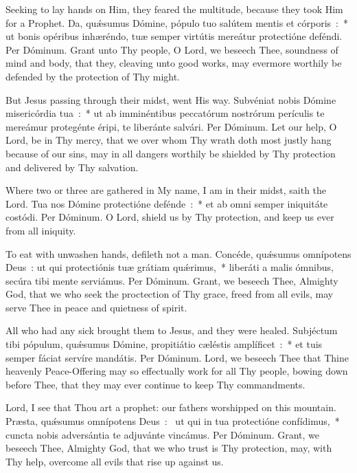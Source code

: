 {{  
  {Seeking to lay hands on Him, they feared the multitude, because they took Him for a Prophet.}
  {Da, quǽsumus Dómine, pópulo tuo salútem mentis et córporis~:~* ut bonis opéribus inhæréndo, tuæ semper virtútis mereátur protectióne deféndi. Per Dóminum.}
  {Grant unto Thy people, O Lord, we beseech Thee, soundness of mind and body, that they, cleaving unto good works, may evermore worthily be defended by the protection of Thy might.}

  {But Jesus passing through their midst, went His way.}
  {Subvéniat nobis Dómine misericórdia tua~:~* ut ab imminéntibus peccatórum nostrórum perículis te mereámur protegénte éripi, te liberánte salvári. Per Dóminum.}
  {Let our help, O Lord, be in Thy mercy, that we over whom Thy wrath doth most justly hang because of our sins, may in all dangers worthily be shielded by Thy protection and delivered by Thy salvation.}

  {Where two or three are gathered in My name, I am in their midst, saith the Lord.}
  {Tua nos Dómine protectióne defénde~:~* et ab omni semper iniquitáte costódi. Per Dóminum.}
  {O Lord, shield us by Thy protection, and keep us ever from all iniquity.}

  {To eat with unwashen hands, defileth not a man.}
  {Concéde, quǽsumus omnípotens Deus~: ut qui protectiónis tuæ grátiam quǽrimus,~* liberáti a malis ómnibus, secúra tibi mente serviámus. Per Dóminum.}
  {Grant, we beseech Thee, Almighty God, that we who seek the proctection of Thy grace, freed from all evils, may serve Thee in peace and quietness of spirit.}

  {All who had any sick brought them to Jesus, and they were healed.}
  {Subjéctum tibi pópulum, quǽsumus Dómine, propitiátio cæléstis amplíficet~:~* et tuis semper fáciat servíre mandátis. Per Dóminum.}
  {Lord, we beseech Thee that Thine heavenly Peace-Offering may so effectually work for all Thy people, bowing down before Thee, that they may ever continue to keep Thy commandments.}

  {Lord, I see that Thou art a prophet: our fathers worshipped on this mountain.}
  {Præsta, quǽsumus omnípotens Deus~:~\dag{} ut qui in tua protectióne confídimus,~* cuncta nobis adversántia te adjuvánte vincámus. Per Dóminum.}
  {Grant, we beseech Thee, Almighty God, that we who trust is Thy protection, may, with Thy help, overcome all evils that rise up against us.}

}}
